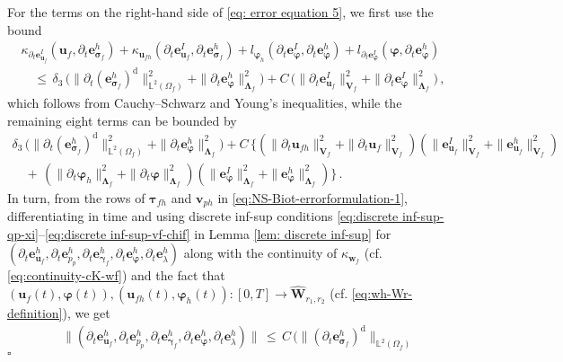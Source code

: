 \documentclass[11pt]{article}
\numberwithin{equation}{section}
\newcommand{\ds}{\displaystyle}
\newcommand{\bgamma}{{\boldsymbol\gamma}}
\newcommand{\bLambda}{{\boldsymbol\Lambda}}
\newcommand{\bsi}{{\boldsymbol\sigma}}
\newcommand{\bvarphi}{{\boldsymbol\varphi}}
\newcommand{\btau}{{\boldsymbol\tau}}
\newcommand{\bv}{{\mathbf{v}}}
\newcommand{\bw}{{\mathbf{w}}}
\newcommand{\bu}{\mathbf{u}}
\newcommand{\be}{{\mathbf{e}}}
\newcommand{\0}{{\mathbf{0}}}
\def\bV{\mathbf{V}}
\def\bW{\mathbf{W}}
\newcommand\bbL{\mathbb{L}}
\def\rd{\mathrm{d}}
\def\wh{\widehat}
\newenvironment{proof}{\noindent{\it Proof.}}{\hfill$\square$}
\numberwithin{equation}{section}
\begin{document}
\begin{proof}
For the terms on the right-hand side of \eqref{eq: error equation 5}, we first use the bound
\begin{equation*}
\begin{array}{l}
\ds \kappa_{\partial_t\be_{\bu_{f}}^I}(\bu_{f}, \partial_t\be_{\bsi_f}^h)  
+ \kappa_{\bu_{fh}}(\partial_t\be_{\bu_{f}}^I, \partial_t\be_{\bsi_f}^h)
+ l_{\bvarphi_h}(\partial_t\be_{\bvarphi}^I,\partial_t\be_{\bvarphi}^h)
+ l_{\partial_t\be_{\bvarphi}^I}(\bvarphi,\partial_t\be_{\bvarphi}^h) \\[2ex] 
\ds\quad \leq\, \delta_3\,\Big(\|\partial_t(\be_{\bsi_f}^h)^\rd\|^2_{\bbL^2(\Omega_f)} + \|\partial_t\be_{\bvarphi}^h\|^2_{\bLambda_f} \Big) 
+ C\,\Big(\|\partial_{t}\be_{\bu_f}^I\|^2_{\bV_f} + \|\partial_t\be_{\bvarphi}^I\|^2_{\bLambda_f}\Big) \,,
\end{array}
\end{equation*}
which follows from Cauchy--Schwarz and Young's inequalities, while the remaining eight terms can be bounded by
\begin{equation*}
\begin{array}{l}
\ds
\delta_3\,\Big(\|\partial_t(\be_{\bsi_f}^h)^\rd\|^2_{\bbL^2(\Omega_f)} + \|\partial_t\be_{\bvarphi}^h\|^2_{\bLambda_f} \Big) 
+ C\,\Big\{ ( \|\partial_{t}\bu_{fh}\|^2_{\bV_f} + \|\partial_{t}\bu_{f}\|^2_{\bV_f})(\|\be_{\bu_f}^I\|^2_{\bV_f} + \|\be_{\bu_f}^h\|^2_{\bV_f} ) \\[2ex]
\ds\quad +\, ( \|\partial_t\bvarphi_{h}\|^2_{\bLambda_f} + \|\partial_t\bvarphi\|^2_{\bLambda_f})(\|\be_{\bvarphi}^I\|^2_{\bLambda_f} + \|\be_{\bvarphi}^h\|^2_{\bLambda_f} ) \Big\} \,.
\end{array}
\end{equation*} 
In turn, from the rows of $\btau_{fh}$ and $\bv_{ph}$ in \eqref{eq:NS-Biot-errorformulation-1}, differentiating in time and using discrete inf-sup conditions \eqref{eq:discrete inf-sup-qp-xi}--\eqref{eq:discrete inf-sup-vf-chif} in Lemma \ref{lem: discrete inf-sup} for $(\partial_t\be_{\bu_{f}}^h, \partial_t\be_{p_{p}}^h, \partial_t\be_{\bgamma_{f}}^h, \partial_t\be_{\bvarphi}^h, \partial_t\be_{\lambda}^h)$ along with the continuity of $\kappa_{\bw_f}$ (cf. \eqref{eq:continuity-cK-wf}) and the fact that $(\bu_f(t),\bvarphi(t)),(\bu_{fh}(t),\bvarphi_{h}(t)):[0,T]\to \wh{\bW}_{r_1,r_2}$ (cf. \eqref{eq:wh-Wr-definition}), we get
\begin{align}
&\|(\partial_t\be_{\bu_{f}}^h, \partial_t\be_{p_{p}}^h, \partial_t\be_{\bgamma_{f}}^h, \partial_t\be_{\bvarphi}^h, \partial_t\be_{\lambda}^h)\|
\,\leq\, C\,\Big( \|(\partial_t\be_{\bsi_f}^h)^\rd\|_{\bbL^2(\Omega_f)} 

\end{align}
\end{proof}
\end{document}
